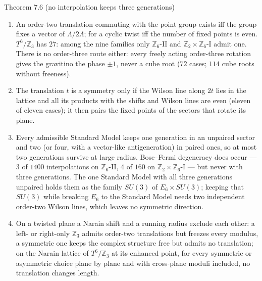\begin{result}{Theorem 7.6 (no interpolation keeps three generations) \hfill \tierC}
\begin{enumerate}[label=(\roman*),leftmargin=1.5em]
\item An order-two translation commuting with the point group exists iff the group fixes a vector of $\Lambda/2\Lambda$; for a
      cyclic twist iff the number of fixed points is even. $T^6/\mathbb Z_3$ has $27$: among the nine families only
      $\mathbb Z_6$-II and $\mathbb Z_2\times\mathbb Z_6$-I admit one. There is no order-three route either: every freely acting
      order-three rotation gives the gravitino the phase $\pm1$, never a cube root ($72$ cases; $114$ cube roots without freeness).
\item The translation $t$ is a symmetry only if the Wilson line along $2t$ lies in the lattice and all its products with the shifts
      and Wilson lines are even (eleven of eleven cases); it then pairs the fixed points of the sectors that rotate its plane.
\item Every admissible Standard Model keeps one generation in an unpaired sector and two (or four, with a vector-like
      antigeneration) in paired ones, so at most two generations survive at large radius. Bose--Fermi degeneracy does occur ---
      $3$ of $1400$ interpolations on $\mathbb Z_6$-II, $4$ of $160$ on $\mathbb Z_2\times\mathbb Z_6$-I --- but never with three generations.
      The one Standard Model with all three generations unpaired holds them as the family $SU(3)$ of $E_6\times SU(3)$; keeping that
      $SU(3)$ while breaking $E_6$ to the Standard Model needs two independent order-two Wilson lines, which leaves no symmetric direction.
\item On a twisted plane a Narain shift and a running radius exclude each other: a left- or right-only $\mathbb Z_3$ admits order-two
      translations but freezes every modulus, a symmetric one keeps the complex structure free but admits no translation; on the Narain lattice of $T^6/\mathbb Z_3$ at its enhanced point,
      for every symmetric or asymmetric choice plane by plane and with cross-plane moduli included, no translation changes length.
\end{enumerate}
    
\end{result}

